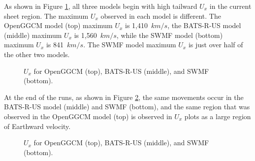 As shown in Figure \ref{fig:UxHighCompressionBeginning},
all three models begin with high tailward $U_x$ in the current sheet
region. The maximum $U_x$ observed in each model is different. The OpenGGCM
model (top) maximum $U_x$ is 1,410~$km/s$, the BATS-R-US model (middle) maximum $U_x$ is
1,560~$km/s$, while the SWMF model (bottom) maximum $U_x$ is 841~$km/s$. The SWMF
model maximum $U_x$ is just over half of the other two models.
\begin{figure}
	\centering
	\caption{$U_x$ for OpenGGCM (top), BATS-R-US (middle), and SWMF (bottom).}
	\figSpace
	\label{fig:UxHighCompressionBeginning}
\end{figure}
At the end of the runs, as shown in Figure \ref{fig:UxHighCompressionEnd}, the
same movements occur in the BATS-R-US model (middle) and SWMF (bottom), and the same
region that was observed in the OpenGGCM model (top) is observed in $U_x$ plots as a
large region of Earthward velocity.
\begin{figure}
	\centering
	\caption{$U_x$ for OpenGGCM (top), BATS-R-US (middle), and SWMF (bottom).}
	\figSpace
	\label{fig:UxHighCompressionEnd}
\end{figure}

